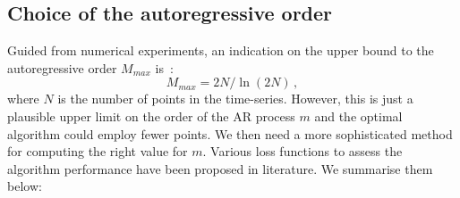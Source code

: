 \documentclass[twocolumn,showpacs,preprintnumbers,nofootinbib,prd,
superscriptaddress,10pt]{revtex4-1}
\begin{document}
\subsection{Choice of the autoregressive order}\label{sec:optimizers} 

Guided from numerical experiments, an indication on the upper bound to the autoregressive order $M_{max}$ is~\cite{doi:10.1190/1.1440902}:
\begin{equation}\label{eq:MMAx}
M_{max} = 2N / \ln{(2N)}\,,
\end{equation}
where $N$ is the number of points in the time-series.
However, this is just a plausible upper limit on the order of the AR process $m$ and the optimal algorithm could employ fewer points.
We then need a more sophisticated method for computing the right value for $m$.
Various loss functions to assess the algorithm performance have been proposed in literature.
We summarise them below:
\end{document}
